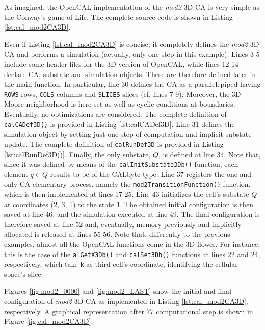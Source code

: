 As imagined, the OpenCAL implementation of the \emph{mod2} 3D
CA is very simple as the Conway's game of Life. The complete
source code is shown in Listing \ref{lst:cal_mod2CA3D}.





Even if Listing \ref{lst:cal_mod2CA3D} is concise, it completely
defines the \emph{mod2} 3D CA and performs a simulation (actually,
only one step in this example). Lines 3-5 include some header files
for the 3D version of OpenCAL, while lines 12-14 declare CA, substate
and simulation objects. These are therefore defined later in the main
function. In particular, line 30 defines the CA as a parallelepiped
having \verb'ROWS' rows, \verb'COLS' columns and \verb'SLICES' slices
(cf. lines 7-9). Moreover, the 3D Moore neighborhood is here set as
well as cyclic conditions at boundaries. Eventually, no optimizations
are considered. The complete definition of \verb'calCADef3D()' is
provided in Listing \ref{lst:calCADef3D}. Line 31 defines the
simulation object by setting just one step of computation and implicit
substate update. The complete definition of \verb'calRunDef3D' is
provided in Listing \ref{lst:calRunDef3D()}. Finally, the only substate,
$Q$, is defined at line 34. Note that, since it was defined by means
of the \verb'calInitSubstate3Db()' function, each element $q \in Q$
results to be of the CALbyte type. Line 37 registers the one and only
CA elementary process, namely the \verb'mod2TransitionFunction()'
function, which is then implemented at lines 17-25. Line 43
initializes the cell's substate $Q$ at coordinates (2, 3, 1) to the
state 1. The obtained initial configuration is then saved at line 46,
and the simulation executed at line 49. The final configuration is
therefore saved at line 52 and, eventually, memory previously and
implicitly allocated is released at lines 55-56. Note that,
differently to the previous examples, almost all the OpenCAL functions
come in the 3D flower. For instance, this is the case of the
\verb'alGetX3Db()' and \verb'calSet3Db()' functions at lines 22 and
24, respectively, which take \verb'k' as third cell's coordinate,
identifying the cellular space's slice.

Figures \ref{fig:mod2_0000} and \ref{fig:mod2_LAST} show the initial
and final configuration of \emph{mod2} 3D CA as implemented in Listing
\ref{lst:cal_mod2CA3D}, respectively. A graphical representation after
77 computational step is shown in Figure \ref{fig:cal_mod2CA3D}.

